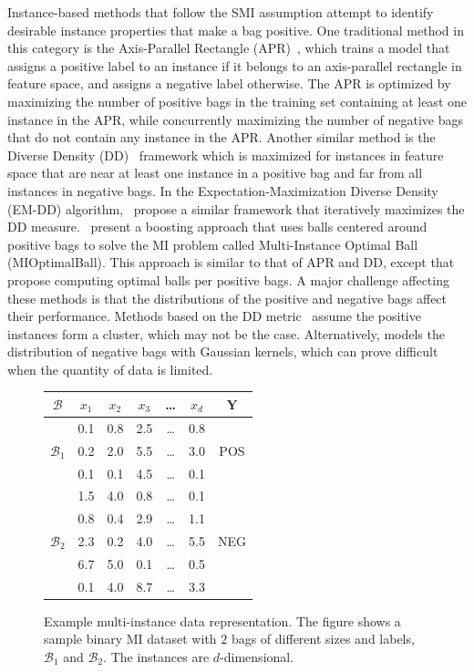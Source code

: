 \documentclass[preprint,12pt]{elsarticle}
\begin{document}
Instance-based methods that follow the SMI assumption attempt to identify desirable instance properties that make a bag positive. One traditional method in this category is the Axis-Parallel Rectangle (APR)~\citep{Dietterich1997}, which trains a model that assigns a positive label to an instance if it belongs to an axis-parallel rectangle in feature space, and assigns a negative label otherwise. The APR is optimized by maximizing the number of positive bags in the training set containing at least one instance in the APR, while concurrently maximizing the number of negative bags that do not contain any instance in the APR. Another similar method is the Diverse Density (DD)~\citep{Maron1998} framework which is maximized for instances in feature space that are near at least one instance in a positive bag and far from all instances in negative bags. In the Expectation-Maximization Diverse Density (EM-DD) algorithm,~\citet{Zhang2001} propose a similar framework that iteratively maximizes the DD measure.~\citet{Auer2004} present a boosting approach that uses balls centered around positive bags to solve the MI problem called Multi-Instance Optimal Ball (MIOptimalBall). This approach is similar to that of APR and DD, except that~\citet{Auer2004} propose computing optimal balls per positive bags. A major challenge affecting these methods is that the distributions of the positive and negative bags affect their performance. Methods based on the DD metric~\citep{qi2007,Carbonneau2016,Chen2006,Chen2004} assume the positive instances form a cluster, which may not be the case. Alternatively, \citet{Fu2011} models the distribution of negative bags with Gaussian kernels, which can prove difficult when the quantity of data is limited. 
\begin{figure}
\centering
\begin{tabular}{|c|ccccc|c|}
\hline
$\mathcal{B}$ & $x_1$ & $x_2$ & $x_3$ & \ldots & $x_d$ & $\bm Y$ \\        
\hline
    	  & 0.1 & 0.8 & 2.5 & \ldots & 0.8 &    \\        
    $\mathcal{B}_1$ 	  & 0.2 & 2.0 & 5.5 & \ldots & 3.0 & POS \\
    	  & 0.1 & 0.1   & 4.5 & \ldots & 0.1 &    \\
\hline
    	  & 1.5 & 4.0 & 0.8 & \ldots & 0.1 &    \\
    	  & 0.8 & 0.4 & 2.9 & \ldots & 1.1 &    \\
    $\mathcal{B}_2$	  & 2.3 & 0.2 & 4.0 & \ldots & 5.5 & NEG \\
    	  & 6.7 & 5.0 & 0.1  & \ldots & 0.5 &    \\
    	  & 0.1 & 4.0 & 8.7 & \ldots & 3.3 &    \\
\hline
  \end{tabular}
  \caption{Example multi-instance data representation. The figure shows a sample binary MI dataset with $2$ bags of different sizes and labels, $\mathcal{B}_1$ and $\mathcal{B}_2$. The instances are $d$-dimensional.}%
  \label{fig:mirep}%
\end{figure}
\end{document}
